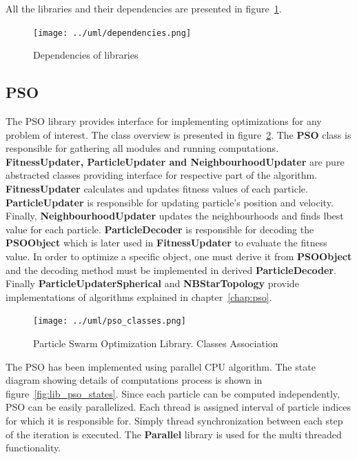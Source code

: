 \documentclass{mini}
\begin{document}
All the libraries and their dependencies are presented in figure~\ref{fig:lib_dependencies}.

\begin{figure}[H]
    \centering
    \texttt{[image: ../uml/dependencies.png]}
    \caption{Dependencies of libraries}
    \label{fig:lib_dependencies}
\end{figure}


\subsection{PSO}

The PSO library provides interface for implementing optimizations for any problem of interest. The class overview is presented in figure~\ref{fig:lib_pso_classes}. The {\bf PSO} class is responsible for gathering all modules and running computations. {\bf FitnessUpdater, ParticleUpdater and NeighbourhoodUpdater} are pure abstracted classes providing interface for respective part of the algorithm. {\bf FitnessUpdater} calculates and updates fitness values of each particle. {\bf ParticleUpdater} is responsible for updating particle's position and velocity. Finally, {\bf NeighbourhoodUpdater} updates the neighbourhoods and finds lbest value for each particle. {\bf ParticleDecoder} is responsible for decoding the {\bf PSOObject} which is later used in {\bf FitnessUpdater} to evaluate the fitness value. In order to optimize a specific object, one must derive it from {\bf PSOObject} and the decoding method must be implemented in derived {\bf ParticleDecoder}. Finally {\bf ParticleUpdaterSpherical} and {\bf NBStarTopology} provide implementations of algorithms explained in chapter~\ref{chap:pso}.

\begin{figure}[H]
    \centering
    \texttt{[image: ../uml/pso\_classes.png]}
    \caption{Particle Swarm Optimization Library. Classes Association}
    \label{fig:lib_pso_classes}
\end{figure}

The PSO has been implemented using parallel CPU algorithm. The state diagram showing details of computations process is shown in figure~\ref{fig:lib_pso_states}. Since each particle can be computed independently, PSO can be easily parallelized. Each thread is assigned interval of particle indices for which it is responsible for. Simply thread synchronization between each step of the iteration is executed. The {\bf Parallel } library is used for the multi threaded functionality.
\end{document}
